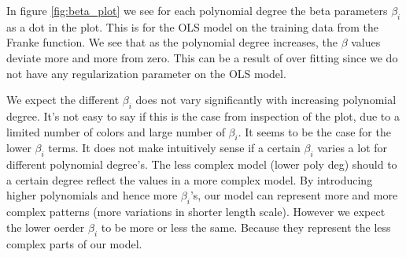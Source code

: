 In figure \ref{fig:beta_plot} we see for each polynomial degree the beta
parameters $\beta_i$ as a dot in the plot. This is for the OLS model on the
training data from the Franke function. We see that as the polynomial degree increases, the $\beta$
values deviate more and more from zero. This can be a result of over fitting
since we do not have any regularization parameter on the OLS model.

We expect the different $\beta _i$ does not vary significantly with increasing
polynomial degree. It's not easy to say if this is the case from inspection of
the plot, due to a limited number of colors and large number of $\beta _i$. It seems to be the case for the
lower $\beta _i$ terms. It does not make intuitively sense if a certain $\beta _i$ varies a
lot for different polynomial degree's. The less complex model (lower poly deg) should to a certain degree
reflect the values in a more complex model. By introducing higher polynomials
and hence more $\beta _i$'s, our model can represent more and more complex
patterns (more variations in shorter length scale). However we expect the lower
oerder $\beta _i$ to be more or less the same. Because they represent the less
complex parts of our model. 
 




